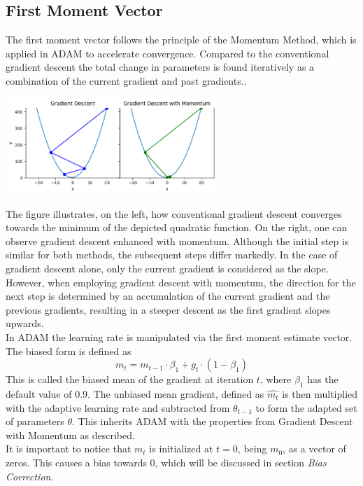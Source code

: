\documentclass[oneside]{article}
\begin{document}
\subsection{First Moment Vector}
The first moment vector follows the principle of the Momentum Method, which is applied in ADAM to accelerate convergence. Compared to the conventional gradient descent the total change in parameters is found iteratively as a combination of the current gradient and past gradients.. \\
\begin{center}
    \includegraphics[width=0.6\textwidth]{report/figures/GD_momentum.png}\\
\end{center}
The figure illustrates, on the left, how conventional gradient descent converges towards the minimum of the depicted quadratic function. On the right, one can observe gradient descent enhanced with momentum. Although the initial step is similar for both methods, the subsequent steps differ markedly. In the case of gradient descent alone, only the current gradient is considered as the slope. However, when employing gradient descent with momentum, the direction for the next step is determined by an accumulation of the current gradient and the previous gradients, resulting in a steeper descent as the first gradient slopes upwards.\\
In ADAM the learning rate is manipulated via the first moment estimate vector. The biased form is defined as 
$$m_t=m_{t-1}\cdot \beta_1 + g_t\cdot (1-\beta_1)$$
This is called the biased mean of the gradient at iteration $t$, where $\beta_1$ has the default value of $0.9$. The unbiased mean gradient, defined as $\hat{m_t}$ is then multiplied with the adaptive learning rate and subtracted from $\theta_{t-1}$ to form the adapted set of parameters $\theta$. This inherits ADAM with the properties from Gradient Descent with Momentum as described.\\
It is important to notice that $m_t$ is initialized at $t=0$, being $m_0$, as a vector of zeros. This causes a bias towards $0$, which will be discussed in section \textit{Bias Correction}.
\end{document}
